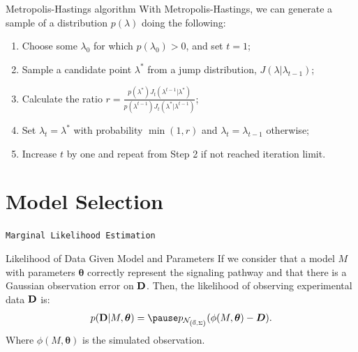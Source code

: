 \documentclass{beamer}
\begin{document}
\begin{frame}{Metropolis-Hastings algorithm}
With Metropolis-Hastings, we can generate a sample of a distribution 
$p(\lambda)$ doing the following:
\pause
    \begin{enumerate}
        \item{Choose some $\lambda_0$ for which $p (\lambda_0) > 0$, and
            set $t = 1$;}

        \pause
        \item{Sample a candidate point $\lambda^*$ from a jump 
            distribution, $J (\lambda | \lambda_{t-1})$;}

        \pause
        \item{Calculate the ratio 
            $r = \frac{p (\lambda^*) J_t (\lambda^{t - 1} | \lambda^*)}
            {p (\lambda^{t - 1}) J_t (\lambda^* | \lambda^{t - 1})}$;}

        \pause
        \item{Set $\lambda_t = \lambda^*$ with probability $\min (1, r)$
            and $\lambda_t = \lambda_{t-1}$ otherwise;}

        \pause
        \item{Increase $t$ by one and repeat from Step 2 if not reached
            iteration limit.}
    \end{enumerate}
\end{frame}


\section{Model Selection}
\begin{frame}{}
\begin{center}
    \texttt{Marginal Likelihood Estimation}
\end{center}
\end{frame}


\begin{frame}{Likelihood of Data Given Model and Parameters}
If we consider that a model $M$ with parameters ${\bm \theta}$ 
correctly represent the signaling pathway \pause and that there is a 
Gaussian observation error on ${\bf D}$.
\pause
Then, the likelihood of observing experimental data ${\bf D}$ is:
\begin{equation*}
    p ({\bf D} | M, {\bm \theta}) = \pause 
        p_{\mathcal{N}_{\left(\vec{0}, \Sigma\right)}} 
            (\phi (M,{\bm \theta}) - {\bm D}).
\end{equation*}
Where $\phi (M, {\bm \theta})$ is the simulated observation.
\end{frame}
\end{document}
